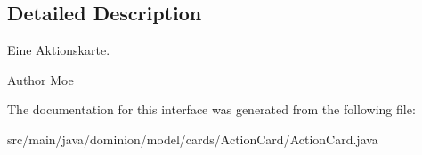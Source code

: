 \subsection{\-Detailed \-Description}
\-Eine \-Aktionskarte.

\begin{DoxyAuthor}{\-Author}
\-Moe 
\end{DoxyAuthor}


\-The documentation for this interface was generated from the following file\-:\begin{DoxyCompactItemize}
\item 
src/main/java/dominion/model/cards/\-Action\-Card/\-Action\-Card.\-java\end{DoxyCompactItemize}
